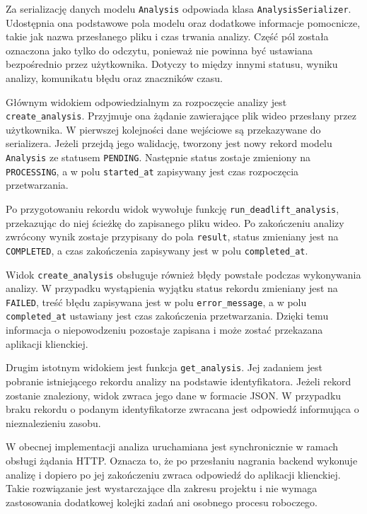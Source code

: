 Za serializację danych modelu \texttt{Analysis} odpowiada klasa \texttt{AnalysisSerializer}. Udostępnia ona podstawowe pola modelu oraz dodatkowe informacje pomocnicze, takie jak nazwa przesłanego pliku i czas trwania analizy. Część pól została oznaczona jako tylko do odczytu, ponieważ nie powinna być ustawiana bezpośrednio przez użytkownika. Dotyczy to między innymi statusu, wyniku analizy, komunikatu błędu oraz znaczników czasu.

Głównym widokiem odpowiedzialnym za rozpoczęcie analizy jest \texttt{create\_analysis}. Przyjmuje ona żądanie zawierające plik wideo przesłany przez użytkownika. W pierwszej kolejności dane wejściowe są przekazywane do serializera. Jeżeli przejdą jego walidację, tworzony jest nowy rekord modelu \texttt{Analysis} ze statusem \texttt{PENDING}. Następnie status zostaje zmieniony na \texttt{PROCESSING}, a w polu \texttt{started\_at} zapisywany jest czas rozpoczęcia przetwarzania.

Po przygotowaniu rekordu widok wywołuje funkcję \texttt{run\_deadlift\_analysis}, przekazując do niej ścieżkę do zapisanego pliku wideo. Po zakończeniu analizy zwrócony wynik zostaje przypisany do pola \texttt{result}, status zmieniany jest na \texttt{COMPLETED}, a czas zakończenia zapisywany jest w polu \texttt{completed\_at}.

Widok \texttt{create\_analysis} obsługuje również błędy powstałe podczas wykonywania analizy. W przypadku wystąpienia wyjątku status rekordu zmieniany jest na \texttt{FAILED}, treść błędu zapisywana jest w polu \texttt{error\_message}, a w polu \texttt{completed\_at} ustawiany jest czas zakończenia przetwarzania. Dzięki temu informacja o niepowodzeniu pozostaje zapisana i może zostać przekazana aplikacji klienckiej.

Drugim istotnym widokiem jest funkcja \texttt{get\_analysis}. Jej zadaniem jest pobranie istniejącego rekordu analizy na podstawie identyfikatora. Jeżeli rekord zostanie znaleziony, widok zwraca jego dane w formacie JSON. W przypadku braku rekordu o podanym identyfikatorze zwracana jest odpowiedź informująca o nieznalezieniu zasobu.

W obecnej implementacji analiza uruchamiana jest synchronicznie w ramach obsługi żądania HTTP. Oznacza to, że po przesłaniu nagrania backend wykonuje analizę i dopiero po jej zakończeniu zwraca odpowiedź do aplikacji klienckiej. Takie rozwiązanie jest wystarczające dla zakresu projektu i nie wymaga zastosowania dodatkowej kolejki zadań ani osobnego procesu roboczego.

